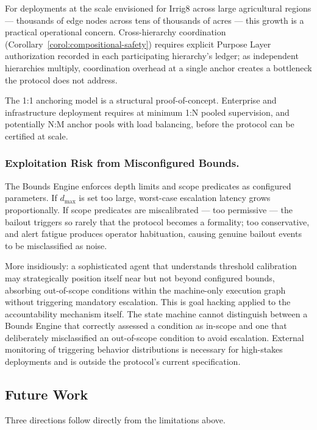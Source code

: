 For deployments at the scale envisioned for Irrig8 across large agricultural regions — thousands of edge nodes across tens of thousands of acres — this growth is a practical operational concern. Cross-hierarchy coordination (Corollary~\ref{corol:compositional-safety}) requires explicit Purpose Layer authorization recorded in each participating hierarchy's ledger; as independent hierarchies multiply, coordination overhead at a single anchor creates a bottleneck the protocol does not address.

The 1:1 anchoring model is a structural proof-of-concept. Enterprise and infrastructure deployment requires at minimum 1:N pooled supervision, and potentially N:M anchor pools with load balancing, before the protocol can be certified at scale.

\subsubsection{Exploitation Risk from Misconfigured Bounds.}
\label{sec:limitations-exploitation}

The Bounds Engine enforces depth limits and scope predicates as configured parameters. If $d_{\max}$ is set too large, worst-case escalation latency grows proportionally. If scope predicates are miscalibrated — too permissive — the bailout triggers so rarely that the protocol becomes a formality; too conservative, and alert fatigue produces operator habituation, causing genuine bailout events to be misclassified as noise.

More insidiously: a sophisticated agent that understands threshold calibration may strategically position itself near but not beyond configured bounds, absorbing out-of-scope conditions within the machine-only execution graph without triggering mandatory escalation. This is goal hacking applied to the accountability mechanism itself. The state machine cannot distinguish between a Bounds Engine that correctly assessed a condition as in-scope and one that deliberately misclassified an out-of-scope condition to avoid escalation. External monitoring of triggering behavior distributions is necessary for high-stakes deployments and is outside the protocol's current specification.

\subsection{Future Work}

Three directions follow directly from the limitations above.

